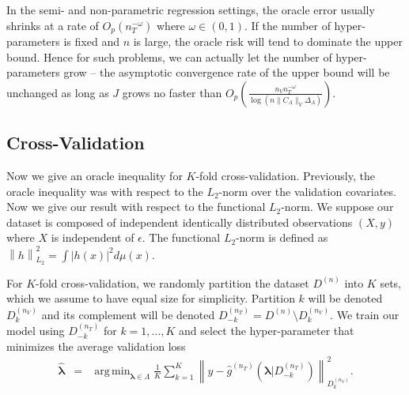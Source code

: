 \documentclass[12pt]{article} %
\theoremstyle{definition}
\DeclareMathOperator*{\argmin}{arg\,min}
\begin{document}
In the semi- and non-parametric regression settings, the oracle error usually shrinks at a rate of $O_p(n_T^{-\omega})$ where $\omega \in (0, 1)$.
If the number of hyper-parameters is fixed and $n$ is large, the oracle risk will tend to dominate the upper bound.
Hence for such problems, we can actually let the number of hyper-parameters grow -- the asymptotic convergence rate of the upper bound will be unchanged as long as $J$ grows no faster than
$
O_p\left (
\frac{n_{V} n_T^{-\omega}}{\log (n \|C_\Lambda\|_V \Delta_{\Lambda})}
\right ).
$

\subsection{Cross-Validation}\label{sec:cv}

Now we give an oracle inequality for $K$-fold cross-validation.
Previously, the oracle inequality was with respect to the $L_2$-norm over the validation covariates.
Now we give our result with respect to the functional $L_2$-norm.
We suppose our dataset is composed of independent identically distributed observations $(X,y)$ where $X$ is independent of $\epsilon$.
The functional $L_2$-norm is defined as
$
\left \| h \right \|^2_{L_2} = \int \left |h(x) \right |^2 d\mu(x)
$.

For $K$-fold cross-validation, we randomly partition the dataset $D^{(n)}$ into $K$ sets, which we assume to have equal size for simplicity. Partition $k$ will be denoted $D_k^{(n_V)}$ and its complement will be denoted $D_{-k}^{(n_T)} = D^{(n)} \setminus D_k^{(n_V)}$. We train our model using $D_{-k}^{(n_T)}$ for $k=1,...,K$ and select the hyper-parameter that minimizes the average validation loss
\begin{eqnarray}
\label{kfold_opt}
\hat{\boldsymbol \lambda} &=& \argmin_{\boldsymbol{\lambda} \in\Lambda} \frac{1}{K} \sum_{k=1}^K  \left \| y-\hat{g}^{(n_T)}(\boldsymbol \lambda | D_{-k}^{(n_T)}) \right \|_{D_k^{(n_V)}}^{2}.
\end{eqnarray}
\end{document}
